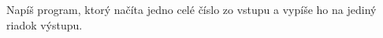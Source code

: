 




Napíš program, ktorý načíta jedno celé číslo zo vstupu a vypíše ho na jediný riadok výstupu.

\koniec


